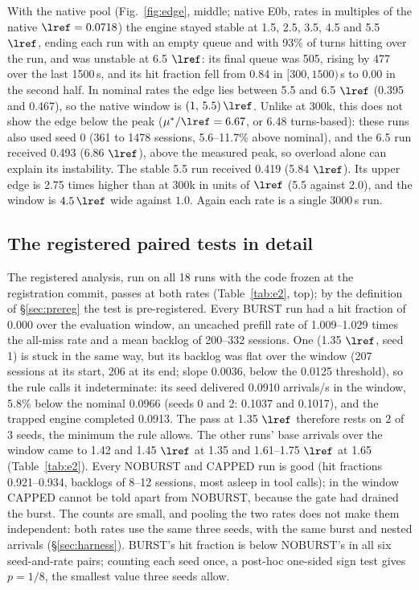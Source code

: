 With the native pool (Fig.~\ref{fig:edge}, middle; native E0b, rates in multiples of the native $\lref=0.0718$\sps) the engine stayed stable at 1.5, 2.5, 3.5, 4.5 and 5.5 $\lref$, ending each run with an empty queue and with 93\% of turns hitting over the run, and was unstable at 6.5 $\lref$: its final queue was 505, rising by 477 over the last 1500\,s, and its hit fraction fell from 0.84 in $[300,1500)$\,s to 0.00 in the second half. In nominal rates the edge lies between 5.5 and 6.5 $\lref$ (0.395 and 0.467\sps), so the native window is $(1,\,5.5)\,\lref$. Unlike at 300k, this does not show the edge below the peak ($\mu^*/\lref=6.67$, or 6.48 turns-based): these runs also used seed 0 (361 to 1478 sessions, 5.6--11.7\% above nominal), and the 6.5 run received 0.493\sps{} (6.86 $\lref$), above the measured peak, so overload alone can explain its instability. The stable 5.5 run received 0.419\sps{} (5.84 $\lref$). Its upper edge is 2.75 times higher than at 300k in units of $\lref$ (5.5 against 2.0), and the window is $4.5\,\lref$ wide against $1.0$. Again each rate is a single 3000\,s run.

\subsection{The registered paired tests in detail}\label{app:e2detail}
The registered analysis, run on all 18 runs with the code frozen at the registration commit, passes at both rates (Table~\ref{tab:e2}, top); by the definition of \S\ref{sec:prereg} the test is pre-registered. Every BURST run had a hit fraction of 0.000 over the evaluation window, an uncached prefill rate of 1.009--1.029 times the all-miss rate and a mean backlog of 200--332 sessions. One (1.35 $\lref$, seed 1) is stuck in the same way, but its backlog was flat over the window (207 sessions at its start, 206 at its end; slope 0.0036\sps, below the 0.0125 threshold), so the rule calls it indeterminate: its seed delivered 0.0910 arrivals/s in the window, 5.8\% below the nominal 0.0966 (seeds 0 and 2: 0.1037 and 0.1017), and the trapped engine completed 0.0913\sps. The pass at 1.35 $\lref$ therefore rests on 2 of 3 seeds, the minimum the rule allows. The other runs' base arrivals over the window came to 1.42 and 1.45 $\lref$ at 1.35 and 1.61--1.75 $\lref$ at 1.65 (Table~\ref{tab:e2}). Every NOBURST and CAPPED run is good (hit fractions 0.921--0.934, backlogs of 8--12 sessions, most asleep in tool calls); in the window CAPPED cannot be told apart from NOBURST, because the gate had drained the burst. The counts are small, and pooling the two rates does not make them independent: both rates use the same three seeds, with the same burst and nested arrivals (\S\ref{sec:harness}). BURST's hit fraction is below NOBURST's in all six seed-and-rate pairs; counting each seed once, a post-hoc one-sided sign test gives $p=1/8$, the smallest value three seeds allow.

